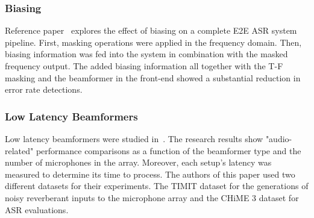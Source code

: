 
\subsubsection{Biasing}
Reference paper~\cite{20202222222} explores the effect of biasing
on a complete E2E ASR system pipeline. 
First, masking operations were
applied in the frequency domain.
Then, biasing information was fed
into the system in combination with the 
masked frequency output. The added biasing information
all together with the T-F masking and the beamformer
in the front-end showed a substantial reduction
in error rate detections.



\subsubsection{Low Latency Beamformers}
Low latency beamformers were studied in~\cite{9003849}.
The research results show 
"audio-related" performance comparisons
as a function of the beamformer type and the number
of microphones in the array.
Moreover, each setup's latency was measured to determine 
its time to process. 
The authors of this paper used
two different datasets for their experiments.
The TIMIT dataset for the generations of noisy reverberant
inputs to the microphone array and the CHiME 3 dataset
for ASR evaluations.


